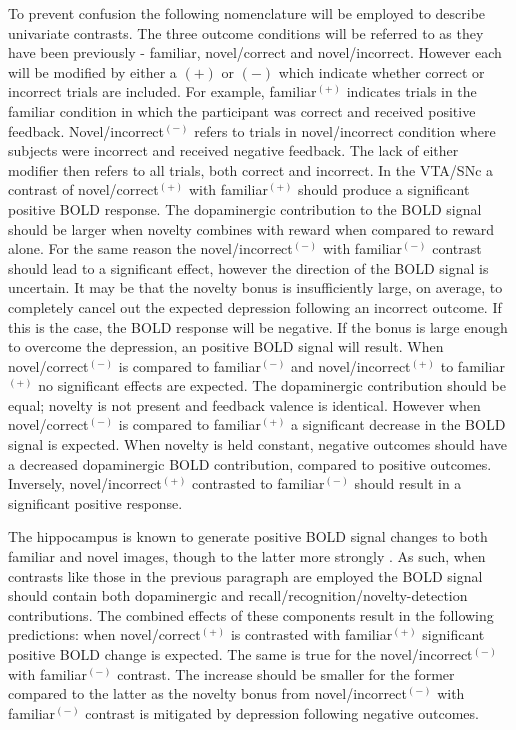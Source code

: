 \documentclass[doc]{apa}        %
\begin{document}
To prevent confusion the following nomenclature will be employed to describe univariate contrasts.  The three outcome conditions will be referred to as they have been previously - familiar, novel/correct and novel/incorrect.  However each will be modified by either a $(+)$ or $(-)$ which indicate whether correct or incorrect trials are included.  For example, familiar$^{(+)}$ indicates trials in the familiar condition in which the participant was correct and received positive feedback.  Novel/incorrect$^{(-)}$ refers to trials in novel/incorrect condition where subjects were incorrect and received negative feedback.  The lack of either modifier then refers to all trials, both correct and incorrect.
In the VTA/SNc a contrast of novel/correct$^{(+)}$ with familiar$^{(+)}$ should produce a significant positive BOLD response.  The dopaminergic contribution to the BOLD signal should be larger when novelty combines with reward when compared to reward alone.  For the same reason the novel/incorrect$^{(-)}$ with familiar$^{(-)}$ contrast should lead to a significant effect, however the direction of the BOLD signal is uncertain.  It may be that the novelty bonus is insufficiently large, on average, to completely cancel out the expected depression following an incorrect outcome.  If this is the case, the BOLD response will be negative.  If the bonus is large enough to overcome the depression, an positive BOLD signal will result.  When novel/correct$^{(-)}$ is compared to familiar$^{(-)}$ and novel/incorrect$^{(+)}$ to familiar$^{(+)}$ no significant effects are expected.  The dopaminergic contribution should be equal; novelty is not present and feedback valence is identical.  However when novel/correct$^{(-)}$ is compared to familiar$^{(+)}$ a significant decrease in the BOLD signal is expected.  When novelty is held constant, negative outcomes should have a decreased dopaminergic BOLD contribution, compared to positive outcomes.  Inversely, novel/incorrect$^{(+)}$ contrasted to familiar$^{(-)}$ should result in a significant positive response.

The hippocampus is known to generate positive BOLD signal changes to both familiar and novel images, though to the latter more strongly \cite{Johnson:2009p6667}.  As such, when contrasts like those in the previous paragraph are employed the BOLD signal should contain both dopaminergic and recall/recognition/novelty-detection contributions. The combined effects of these components result in the following predictions: when novel/correct$^{(+)}$ is contrasted with familiar$^{(+)}$ significant positive BOLD change is expected.  The same is true for the novel/incorrect$^{(-)}$ with familiar$^{(-)}$ contrast.  The increase should be smaller for the former compared to the latter as the novelty bonus from novel/incorrect$^{(-)}$ with familiar$^{(-)}$ contrast is mitigated by depression following negative outcomes.
\end{document}
